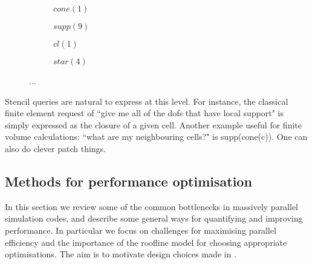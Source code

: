 \begin{figure}
  \centering
  \begin{subfigure}{0.45\textwidth}
    \centering
    \caption{$cone(1)$}
  \end{subfigure}
  \begin{subfigure}{0.45\textwidth}
    \centering
    \caption{$supp(9)$}
  \end{subfigure}
  \begin{subfigure}{0.45\textwidth}
    \centering
    \caption{$cl(1)$}
  \end{subfigure}
  \begin{subfigure}{0.45\textwidth}
    \centering
    \caption{$star(4)$}
  \end{subfigure}

  \caption{...}
  \label{fig:plex_restrictions}
\end{figure}


Stencil queries are natural to express at this level.
For instance, the classical finite element request of ``give me all of the \glspl{dof} that have local support" is simply expressed as the closure of a given cell.
Another example useful for finite volume calculations: ``what are my neighbouring cells?" is supp(cone(c)).
One can also do clever patch things.


\subsection{Methods for performance optimisation}

In this section we review some of the common bottlenecks in massively parallel simulation codes, and describe some general ways for quantifying and improving performance.
In particular we focus on challenges for maximising parallel efficiency and the importance of the roofline model for choosing appropriate optimisations.
The aim is to motivate design choices made in .

